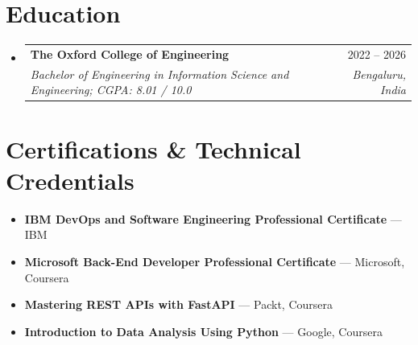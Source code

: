 \documentclass[a4paper,11pt]{article}
\makeatletter
\newcommand{\resumeSubheading}[4]{\item
  \begin{tabular*}{\linewidth}[t]{l@{\extracolsep{\fill}}r}
    \textbf{#1} & #2 \\
    \textit{\small #3} & \textit{\small #4} \\
  \end{tabular*}}
\newcommand{\resumeSubHeadingListStart}{\begin{itemize}[leftmargin=0.15in,label={},itemsep=2.0pt,topsep=1pt,parsep=0pt]}
\newcommand{\resumeSubHeadingListEnd}{\end{itemize}}
\renewcommand{\small}{\fontsize{10.2}{12.6}\selectfont}
\makeatother
\begin{document}
\section{Education}
\resumeSubHeadingListStart
  \resumeSubheading{The Oxford College of Engineering}{2022 -- 2026}{Bachelor of Engineering in Information Science and Engineering; CGPA: 8.01 / 10.0}{Bengaluru, India}
\resumeSubHeadingListEnd

\section{Certifications \& Technical Credentials}
\begin{itemize}[leftmargin=0.15in,label={},topsep=1pt,itemsep=1pt,parsep=0pt]
  \item {\small \textbf{IBM DevOps and Software Engineering Professional Certificate} --- IBM}
  \item {\small \textbf{Microsoft Back-End Developer Professional Certificate} --- Microsoft, Coursera}
  \item {\small \textbf{Mastering REST APIs with FastAPI} --- Packt, Coursera}
  \item {\small \textbf{Introduction to Data Analysis Using Python} --- Google, Coursera}
\end{itemize}
\end{document}
